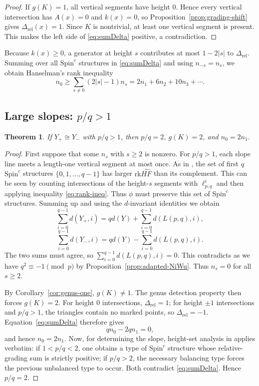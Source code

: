 \documentclass[12pt]{amsart}
\newtheorem{theorem}{Theorem}[section]
\theoremstyle{definition}
\theoremstyle{definition}
\newcommand{\Spin}{\text{Spin}}
\newcommand{\HFhat}{\widehat{HF}}
\newcommand{\rk}{\text{rk}}
\newcommand{\Drel}{\Delta_{\mathrm{rel}}}
\newcommand{\din}{d}
\begin{document}
\begin{proof}
If $g(K)=1$, all vertical segments have height $0$.  Hence every vertical
intersection has $A(x)=0$ and $k(x)=0$, so Proposition~\ref{prop:grading-shift}
gives $\Drel(x)=1$.  Since $K$ is nontrivial, at least one vertical segment is
present.  This makes the left side of \eqref{eq:sumDelta} positive, a
contradiction.
\end{proof}

Because $k(x)\ge0$, a generator at height $s$ contributes at most
$1-2|s|$ to $\Drel$.  Summing over all $\mathrm{Spin}^c$ structures in
\eqref{eq:sumDelta} and using $n_{-s}=n_s$, we obtain
Hanselman's rank inequality
\begin{equation}\label{eq:rank-ineq}
n_0\ge \sum_{s\ne0}(2|s|-1)n_s
     =2n_1+6n_2+10n_3+\cdots.
\end{equation}
\subsection{Large slopes: $p/q>1$}

\begin{theorem}\label{thm:large-slopes}
If $Y_+\cong Y_-$ with $p/q>1$, then $p/q=2$, $g(K)=2$, and $n_0=2n_1$.
\end{theorem}

\begin{proof}
First suppose that some $n_s$ with $s\ge2$ is nonzero.  For $p/q>1$, each
slope line meets a length-one vertical segment at most once.  As in
\cite[Theorem~27]{Han}, the set of first $q$ 
${\Spin}^c$ structures $\{ 0,1,\ldots,q-1\}$
 has larger $\rk\HFhat$ than its complement. This
 can be seen by counting intersections  of the height-$s$ segments with  $\ell^i_{p,q}$ and then applying  inequality
\eqref{eq:rank-ineq}. Thus $\phi$ must preserve this set
of $\mathrm{Spin}^c$ structures.
  Summing up and
using the $\din$-invariant identities we obtain
\[
\sum_{i=0}^{q-1}\din(Y_+,i)
= q\din(Y)+\sum_{i=0}^{q-1}\din(L(p,q),i),
\]
\[
\sum_{i=0}^{q-1}\din(Y_-,i)
= q\din(Y)-\sum_{i=0}^{q-1}\din(L(p,q),i).
\]
The two sums must agree, so
$\sum_{i=0}^{q-1}\din(L(p,q),i)=0$.  This contradicts
\cite[Lemma~23]{Han} as we have
$q^2\equiv -1\pmod p$ by Proposition~\ref{prop:adapted-NiWu}.  Thus
$n_s=0$ for all $s\ge2$.

By Corollary~\ref{cor:genus-one}, $g(K)\ne1$.  The genus detection property then forces $g(K)=2$.  For height
$0$ intersections, $\Drel=1$; for height $\pm1$ intersections and $p/q>1$, the
triangles contain no marked points, so $\Drel=-1$.  Equation~\eqref{eq:sumDelta}
therefore gives
\[
q n_0 -2q n_1=0,
\]
and hence $n_0=2n_1$. Now, for determining the slope, height-set analysis
in \cite[Theorem~27]{Han} applies verbatim: if $1<p/q<2$, one obtains a type of
$\mathrm{Spin}^c$ structure whose relative-grading sum is strictly positive;
if $p/q>2$, the necessary balancing type forces the previous unbalanced type to
occur.  Both contradict \eqref{eq:sumDelta}.  Hence $p/q=2$.
\end{proof}
\end{document}
